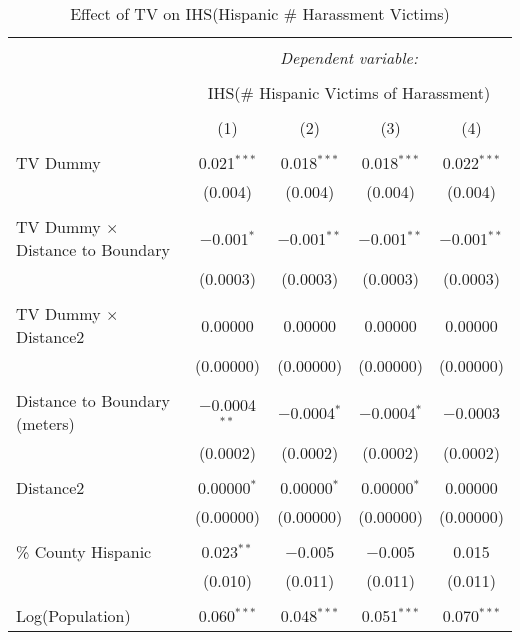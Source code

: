 
\begin{table}[!htbp] \centering 
  \caption{Effect of TV on IHS(Hispanic \# Harassment Victims)} 
  \label{} 
\begin{tabular}{@{\extracolsep{-2pt}}lcccc} 
\\[-1.8ex]\hline 
\hline \\[-1.8ex] 
 & \multicolumn{4}{c}{\textit{Dependent variable:}} \\ 
\cline{2-5} 
\\[-1.8ex] & \multicolumn{4}{c}{IHS(\# Hispanic Victims of Harassment)} \\ 
\\[-1.8ex] & (1) & (2) & (3) & (4)\\ 
\hline \\[-1.8ex] 
 TV Dummy & 0.021$^{***}$ & 0.018$^{***}$ & 0.018$^{***}$ & 0.022$^{***}$ \\ 
  & (0.004) & (0.004) & (0.004) & (0.004) \\ 
  & & & & \\ 
 TV Dummy $\times$ Distance to Boundary & $-$0.001$^{*}$ & $-$0.001$^{**}$ & $-$0.001$^{**}$ & $-$0.001$^{**}$ \\ 
  & (0.0003) & (0.0003) & (0.0003) & (0.0003) \\ 
  & & & & \\ 
 TV Dummy $\times$ Distance2 & 0.00000 & 0.00000 & 0.00000 & 0.00000 \\ 
  & (0.00000) & (0.00000) & (0.00000) & (0.00000) \\ 
  & & & & \\ 
 Distance to Boundary (meters) & $-$0.0004$^{**}$ & $-$0.0004$^{*}$ & $-$0.0004$^{*}$ & $-$0.0003 \\ 
  & (0.0002) & (0.0002) & (0.0002) & (0.0002) \\ 
  & & & & \\ 
 Distance2 & 0.00000$^{*}$ & 0.00000$^{*}$ & 0.00000$^{*}$ & 0.00000 \\ 
  & (0.00000) & (0.00000) & (0.00000) & (0.00000) \\ 
  & & & & \\ 
 \% County Hispanic & 0.023$^{**}$ & $-$0.005 & $-$0.005 & 0.015 \\ 
  & (0.010) & (0.011) & (0.011) & (0.011) \\ 
  & & & & \\ 
 Log(Population) & 0.060$^{***}$ & 0.048$^{***}$ & 0.051$^{***}$ & 0.070$^{***}$ \\ 

\end{tabular}
\end{table}
